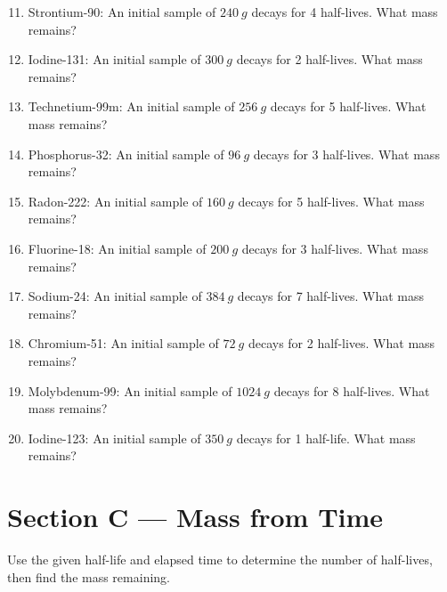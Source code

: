 \documentclass[12pt]{article}
\begin{document}
\begin{enumerate}
\setcounter{enumi}{10}
\item Strontium-90: An initial sample of \(\SI{240}{g}\) decays for 4 half-lives. What mass remains?
\item Iodine-131: An initial sample of \(\SI{300}{g}\) decays for 2 half-lives. What mass remains?
\item Technetium-99m: An initial sample of \(\SI{256}{g}\) decays for 5 half-lives. What mass remains?
\item Phosphorus-32: An initial sample of \(\SI{96}{g}\) decays for 3 half-lives. What mass remains?
\item Radon-222: An initial sample of \(\SI{160}{g}\) decays for 5 half-lives. What mass remains?
\item Fluorine-18: An initial sample of \(\SI{200}{g}\) decays for 3 half-lives. What mass remains?
\item Sodium-24: An initial sample of \(\SI{384}{g}\) decays for 7 half-lives. What mass remains?
\item Chromium-51: An initial sample of \(\SI{72}{g}\) decays for 2 half-lives. What mass remains?
\item Molybdenum-99: An initial sample of \(\SI{1024}{g}\) decays for 8 half-lives. What mass remains?
\item Iodine-123: An initial sample of \(\SI{350}{g}\) decays for 1 half-life. What mass remains?
\end{enumerate}

\section*{Section C — Mass from Time}
Use the given half-life and elapsed time to determine the number of half-lives, then find the mass remaining.
\end{document}
